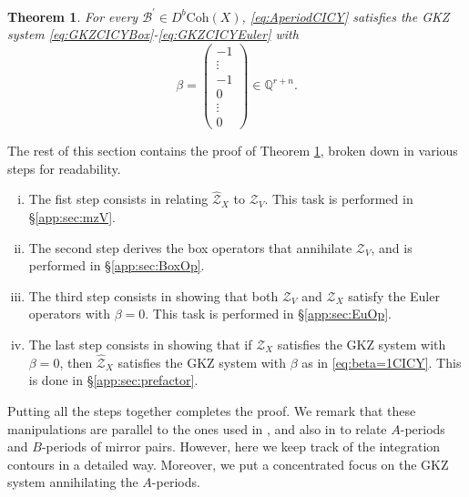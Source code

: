 \documentclass[12pt,a4paper,oneside]{amsart}
\numberwithin{equation}{section}
\newtheorem{thm}{Theorem}[section]
\theoremstyle{definition}
\theoremstyle{remark}
\newcommand{\mz}{\mathcal{Z}}
\newcommand{\Br}{\mathcal{B}}
\newcommand{\pz}{\widehat{\mathcal{Z}}}
\begin{document}
\begin{appendix}
\begin{thm}\label{thm:CICYGKZ}For every $\Br^{\prime} \in D^{b} \mathrm{Coh} (X)$, \eqref{eq:AperiodCICY} satisfies the GKZ system \eqref{eq:GKZCICYBox}-\eqref{eq:GKZCICYEuler}
with 
\begin{equation}
\label{eq:beta=1CICY}
\beta = \left( \begin{matrix} -1 \\ \vdots \\ -1 \\ 0 \\ \vdots \\ 0\end{matrix} \right) \in \mathbb{Q}^{r+n} .
\end{equation}
\end{thm}
The rest of this section contains the proof of Theorem \ref{thm:CICYGKZ}, broken down in various steps for readability.
\begin{enumerate}[(i)]
    \item The fist step consists in relating $\pz_X$ to $\mz_V$. This task is performed in \S\ref{app:sec:mzV}.
    \item The second step derives the box operators that annihilate $\mz_V$, and is performed in \S\ref{app:sec:BoxOp}.
    \item The third step consists in showing that both $\mz_V$ and $\mz_X$ satisfy the Euler operators with $\beta=0$. This task is performed in \S\ref{app:sec:EuOp}.
    \item The last step consists in showing that if $\mz_X$ satisfies the GKZ system with $\beta=0$, then $\pz_X$ satisfies the GKZ system with $\beta$ as in \eqref{eq:beta=1CICY}. This is done in \S\ref{app:sec:prefactor}.
\end{enumerate}
Putting all the steps together completes the proof. We remark that these manipulations are parallel to the ones used in \cite{Hori:2000kt}, and also in \cite{Hori:2013ika} to relate $A$-periods and $B$-periods of mirror pairs. However, here we keep track of the integration contours in a detailed way. Moreover, we put a concentrated focus on the GKZ system annihilating the $A$-periods.\par



\end{appendix}
\end{document}
